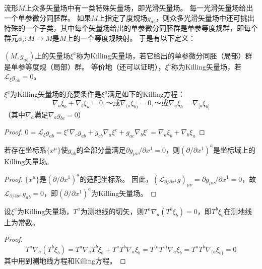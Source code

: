 流形$M$上众多矢量场中有一类特殊矢量场，即光滑矢量场。
每一光滑矢量场给出一个单参微分同胚群。
如果$M$上指定了度规场$g_{ab}$，则众多光滑矢量场中还可挑出特殊的一个子类，其中每个矢量场给出的单参微分同胚群是单参等度规群，即每个群元$\phi_t \colon M \to M$是$M$上的一个等度规映射。
于是有以下定义：

\begin{definition}
$(M, g_{ab})$上的矢量场$\xi^a$称为Killing矢量场，若它给出的单参微分同胚（局部）群是单参等度规（局部）群。
等价地（还可以证明），$\xi^a$称为Killing矢量场，若$\mathscr{L}_{\xi}g_{ab} = 0$。
\end{definition}

\begin{theorem}
$\xi^a$为Killing矢量场的充要条件是$\xi^a$满足如下的Killing方程：
$$\nabla_a\xi_b + \nabla_b\xi_a = 0, ～ \text{或} \nabla_{(a}\xi_{b)} = 0, ～ \text{或} \nabla_a\xi_b = \nabla_{[a}\xi_{b]}$$
（其中$\nabla_a$满足$\nabla_ag_{bc} = 0$）
\end{theorem}

\begin{proof}
$0 = \mathscr{L}_{\xi}g_{ab} = \xi^c\nabla_cg_{ab} + g_{cb}\nabla_a\xi^c + g_{ac}\nabla_b\xi^c = \nabla_a\xi_b + \nabla_b\xi_a$
\end{proof}

\begin{theorem}
若存在坐标系$\{x^\mu\}$使$g_{ab}$的全部分量满足$\partial g_{\mu\nu} / \partial x^1 = 0$，则$(\partial / \partial x^1)^a$是坐标域上的Killing矢量场。
\end{theorem}

\begin{proof}
$\{x^\mu\}$是$(\partial / \partial x^1)^a$的适配坐标系。
因此，$(\mathscr{L}_{\partial / \partial x^1}g)_{\mu\nu} = \partial g_{\mu\nu} / \partial x^1 = 0$，故$\mathscr{L}_{\partial / \partial x^1}g_{ab} = 0$，即$(\partial / \partial x^1)^a$为Killing矢量场。
\end{proof}

\begin{theorem}
设$\xi^a$为Killing矢量场，$T^a$为测地线的切矢，则$T^a\nabla_a(T^b\xi_b) = 0$，即$T^b\xi_b$在测地线上为常数。
\end{theorem}

\begin{proof}
$$T^a\nabla_a(T^b\xi_b) = T^a\nabla_aT^b\xi_b + T^aT^b\nabla_a\xi_b = T^{(a}T^{b)}\nabla_{a}\xi_{b} = T^{a}T^{b}\nabla_{(a}\xi_{b)} = 0$$
其中用到测地线方程和Killing方程。
\end{proof}

